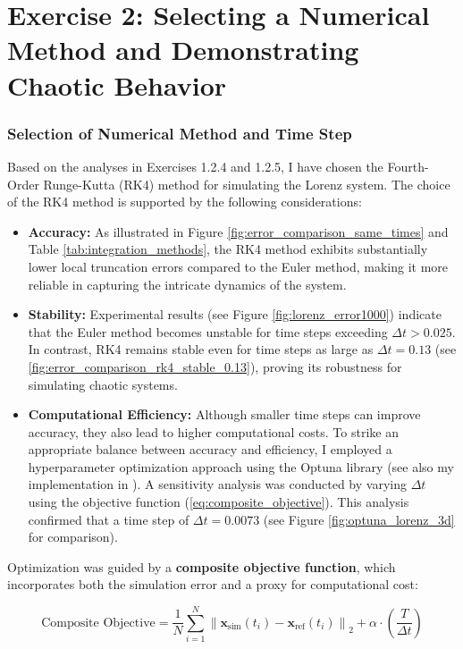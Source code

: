 \section{Exercise 2: Selecting a Numerical Method and Demonstrating Chaotic Behavior}

\subsubsection{Selection of Numerical Method and Time Step}
Based on the analyses in Exercises 1.2.4 and 1.2.5, I have chosen the Fourth-Order Runge-Kutta (RK4) method for simulating the Lorenz system.
The choice of the RK4 method is supported by the following considerations:

\begin{itemize}
    \item \textbf{Accuracy:} As illustrated in Figure \ref{fig:error_comparison_same_times} and Table \ref{tab:integration_methods}, the RK4 method exhibits substantially lower local truncation errors compared to the Euler method, making it more reliable in capturing the intricate dynamics of the system.
    \item \textbf{Stability:} Experimental results (see Figure \ref{fig:lorenz_error1000}) indicate that the Euler method becomes unstable for time steps exceeding \(\Delta t > 0.025\). In contrast, RK4 remains stable even for time steps as large as \(\Delta t = 0.13\) (see \ref{fig:error_comparison_rk4_stable_0.13}), proving its robustness for simulating chaotic systems.
    \item \textbf{Computational Efficiency:} Although smaller time steps can improve accuracy, they also lead to higher computational costs. To strike an appropriate balance between accuracy and efficiency, I employed a hyperparameter optimization approach using the Optuna library \cite{akiba2019optuna} (see also my implementation in \cite{youngaryanOptunaCode}). A sensitivity analysis was conducted by varying \(\Delta t\) using the objective function (\ref{eq:composite_objective}). This analysis confirmed that a time step of \(\Delta t = 0.0073\) (see Figure \ref{fig:optuna_lorenz_3d} for comparison).
\end{itemize}

\noindent
Optimization was guided by a \textbf{composite objective function}, which incorporates both the simulation error and a proxy for computational cost:

\begin{equation}
\text{Composite Objective} = \frac{1}{N} \sum_{i=1}^{N} \left\| \mathbf{x}_{\text{sim}}(t_i) - \mathbf{x}_{\text{ref}}(t_i) \right\|_2 + \alpha \cdot \left( \frac{T}{\Delta t} \right)
\label{eq:composite_objective}
\end{equation}

